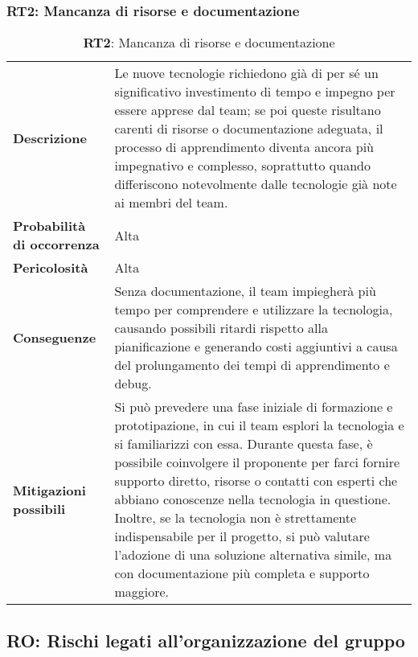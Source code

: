 \subsubsection{RT2: Mancanza di risorse e documentazione}
\begin{table}[h!]
    \centering
    \renewcommand{\arraystretch}{1.5} %
    \begin{tabularx}{\textwidth}{|X|X|}\hline
    \rowcolor[HTML]{FFD700} 
    \multicolumn{2}{|c|}{\textbf{Mancanza di risorse e documentazione}} \\ \hline
    \textbf{Descrizione} & Le nuove tecnologie richiedono già di per sé un significativo investimento di tempo e impegno per essere apprese dal team; 
    se poi queste risultano carenti di risorse o documentazione adeguata, 
    il processo di apprendimento diventa ancora più impegnativo e complesso, soprattutto quando differiscono notevolmente dalle tecnologie già note ai membri del team.\\ \hline
    \textbf{Probabilità di occorrenza} & Alta \\ \hline
    \textbf{Pericolosità} & Alta \\ \hline
    \textbf{Conseguenze} & Senza documentazione, il team impiegherà più tempo per comprendere e utilizzare la tecnologia, 
    causando possibili ritardi rispetto alla pianificazione e generando costi aggiuntivi a causa del prolungamento dei tempi di apprendimento e debug. \\ \hline
    \textbf{Mitigazioni possibili} & Si può prevedere una fase iniziale di formazione e prototipazione, in cui il team esplori la tecnologia e si familiarizzi con essa.
    Durante questa fase, è possibile coinvolgere il proponente per farci fornire supporto diretto, risorse o contatti con esperti che abbiano conoscenze nella tecnologia in questione.
    Inoltre, se la tecnologia non è strettamente indispensabile per il progetto, si può valutare l’adozione di una soluzione alternativa simile, 
    ma con documentazione più completa e supporto maggiore. \\ \hline
    \end{tabularx}
    \caption{\textbf{RT2}: Mancanza di risorse e documentazione}
    \end{table}

\newpage

\subsection{RO: Rischi legati all'organizzazione del gruppo}

